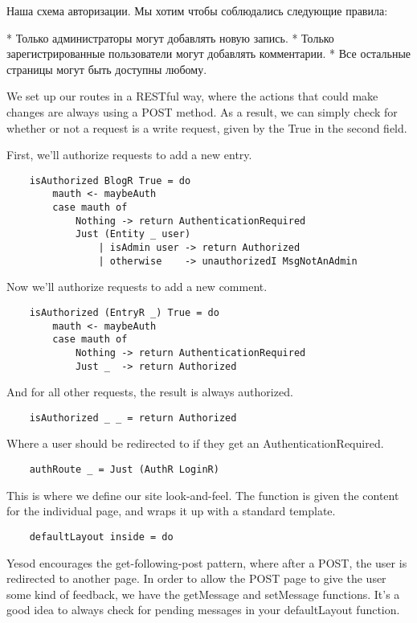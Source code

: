 Наша схема авторизации. Мы хотим чтобы соблюдались следующие правила:

* Только администраторы могут добавлять новую запись. 
* Только зарегистрированные пользователи могут добавлять комментарии. 
* Все остальные страницы могут быть доступны любому.  

We set up our routes in a RESTful way, where the actions that could make changes are always using a POST method. As a result, we can simply check for whether or not a request is a write request, given by the True in the second field.

First, we'll authorize requests to add a new entry.

\begin{lstlisting}
    isAuthorized BlogR True = do
        mauth <- maybeAuth
        case mauth of
            Nothing -> return AuthenticationRequired
            Just (Entity _ user)
                | isAdmin user -> return Authorized
                | otherwise    -> unauthorizedI MsgNotAnAdmin
\end{lstlisting}

Now we'll authorize requests to add a new comment.

\begin{lstlisting}
    isAuthorized (EntryR _) True = do
        mauth <- maybeAuth
        case mauth of
            Nothing -> return AuthenticationRequired
            Just _  -> return Authorized
\end{lstlisting}

And for all other requests, the result is always authorized.

\begin{lstlisting}
    isAuthorized _ _ = return Authorized
\end{lstlisting}

Where a user should be redirected to if they get an AuthenticationRequired.

\begin{lstlisting}
    authRoute _ = Just (AuthR LoginR)
\end{lstlisting}

This is where we define our site look-and-feel. The function is given the content for the individual page, and wraps it up with a standard template.

\begin{lstlisting}
    defaultLayout inside = do
\end{lstlisting}

Yesod encourages the get-following-post pattern, where after a POST, the user is redirected to another page. In order to allow the POST page to give the user some kind of feedback, we have the getMessage and setMessage functions. It's a good idea to always check for pending messages in your defaultLayout function.

